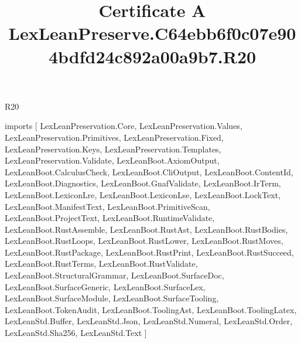 \begin{lexlean}{R20}
\title{Certificate A LexLeanPreserve.C64ebb6f0c07e904bdfd24c892a00a9b7.R20}
\begin{coremodule}
imports [
  LexLeanPreservation.Core,
  LexLeanPreservation.Values,
  LexLeanPreservation.Primitives,
  LexLeanPreservation.Fixed,
  LexLeanPreservation.Keys,
  LexLeanPreservation.Templates,
  LexLeanPreservation.Validate,
  LexLeanBoot.AxiomOutput,
  LexLeanBoot.CalculusCheck,
  LexLeanBoot.CliOutput,
  LexLeanBoot.ContentId,
  LexLeanBoot.Diagnostics,
  LexLeanBoot.GnafValidate,
  LexLeanBoot.IrTerm,
  LexLeanBoot.LexiconLre,
  LexLeanBoot.LexiconLse,
  LexLeanBoot.LockText,
  LexLeanBoot.ManifestText,
  LexLeanBoot.PrimitiveScan,
  LexLeanBoot.ProjectText,
  LexLeanBoot.RuntimeValidate,
  LexLeanBoot.RustAssemble,
  LexLeanBoot.RustAst,
  LexLeanBoot.RustBodies,
  LexLeanBoot.RustLoops,
  LexLeanBoot.RustLower,
  LexLeanBoot.RustMoves,
  LexLeanBoot.RustPackage,
  LexLeanBoot.RustPrint,
  LexLeanBoot.RustSucceed,
  LexLeanBoot.RustTerms,
  LexLeanBoot.RustValidate,
  LexLeanBoot.StructuralGrammar,
  LexLeanBoot.SurfaceDoc,
  LexLeanBoot.SurfaceGeneric,
  LexLeanBoot.SurfaceLex,
  LexLeanBoot.SurfaceModule,
  LexLeanBoot.SurfaceTooling,
  LexLeanBoot.TokenAudit,
  LexLeanBoot.ToolingAst,
  LexLeanBoot.ToolingLatex,
  LexLeanStd.Buffer,
  LexLeanStd.Json,
  LexLeanStd.Numeral,
  LexLeanStd.Order,
  LexLeanStd.Sha256,
  LexLeanStd.Text
]


\end{coremodule}
\end{lexlean}

